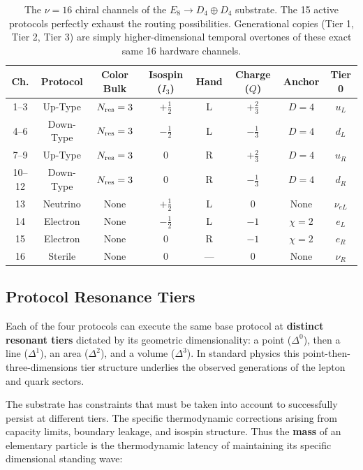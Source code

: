 \begin{table}[t]
\centering
\caption{The $\nu=16$ chiral channels of the $E_8 \to D_4 \oplus D_4$ substrate. The 15 active protocols perfectly exhaust the routing possibilities. Generational copies (Tier 1, Tier 2, Tier 3) are simply higher-dimensional temporal overtones of these exact same 16 hardware channels.}
\label{tab:channels}
\begin{tabular}{|c|c|c|c|c|c|c|c|}
\hline
\textbf{Ch.} & \textbf{Protocol} & \textbf{Color Bulk} & \textbf{Isospin ($I_3$)} & \textbf{Hand} & \textbf{Charge ($Q$)} & \textbf{Anchor} & \textbf{Tier 0} \\
\hline
1--3 & Up-Type & $N_{\rm res}=3$ & $+\frac{1}{2}$ & L & $+\frac{2}{3}$ & $D=4$ & $u_L$ \\
4--6 & Down-Type & $N_{\rm res}=3$ & $-\frac{1}{2}$ & L & $-\frac{1}{3}$ & $D=4$ & $d_L$ \\
7--9 & Up-Type & $N_{\rm res}=3$ & 0 & R & $+\frac{2}{3}$ & $D=4$ & $u_R$ \\
10--12 & Down-Type & $N_{\rm res}=3$ & 0 & R & $-\frac{1}{3}$ & $D=4$ & $d_R$ \\
13 & Neutrino & None & $+\frac{1}{2}$ & L & 0 & None & $\nu_{eL}$ \\
14 & Electron & None & $-\frac{1}{2}$ & L & $-1$ & $\chi=2$ & $e_L$ \\
15 & Electron & None & 0 & R & $-1$ & $\chi=2$ & $e_R$ \\
16 & Sterile & None & 0 & --- & 0 & None & $\nu_R$ \\
\hline
\end{tabular}
\end{table}

\subsection{Protocol Resonance Tiers}

Each of the four protocols can execute the same base protocol at \textbf{distinct resonant tiers} dictated by its geometric dimensionality: a point ($\Delta^0$), then a line ($\Delta^1$), an area ($\Delta^2$), and a volume ($\Delta^3$). In standard physics this point-then-three-dimensions tier structure underlies the observed generations of the lepton and quark sectors.

The substrate has constraints that must be taken into account to successfully persist at different tiers.  The specific thermodynamic corrections arising from capacity limits, boundary leakage, and isospin structure. Thus the \textbf{mass} of an elementary particle is the thermodynamic latency of maintaining its specific dimensional standing wave:

